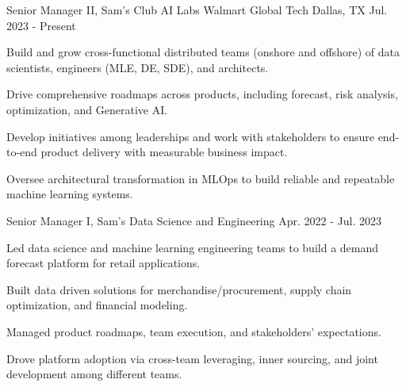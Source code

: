 

\begin{cventries}

	\cventry
		{Senior Manager II, Sam's Club AI Labs} %
		{Walmart Global Tech} %
		{Dallas, TX} %
		{Jul. 2023 - Present} %
		{
			\begin{cvitems} %
				\item {Build and grow cross-functional distributed teams (onshore and offshore) of data scientists, engineers (MLE, DE, SDE), and architects.}
				\item {Drive comprehensive roadmaps across products, including forecast, risk analysis, optimization, and Generative AI.}
				\item {Develop initiatives among leaderships and work with stakeholders to ensure end-to-end product delivery with measurable business impact.}
				\item {Oversee architectural transformation in MLOps to build reliable and repeatable machine learning systems.}
			\end{cvitems}
		}

	\cventry
		{Senior Manager I, Sam's Data Science and Engineering} %
		{} %
		{} %
		{Apr. 2022 - Jul. 2023} %
		{
			\begin{cvitems} %
				\item {Led data science and machine learning engineering teams to build a demand forecast platform for retail applications.}
				\item {Built data driven solutions for merchandise/procurement, supply chain optimization, and financial modeling.}
				\item {Managed product roadmaps, team execution, and stakeholders' expectations.}
				\item {Drove platform adoption via cross-team leveraging, inner sourcing, and joint development among different teams.}
			\end{cvitems}
	}



\end{cventries}
